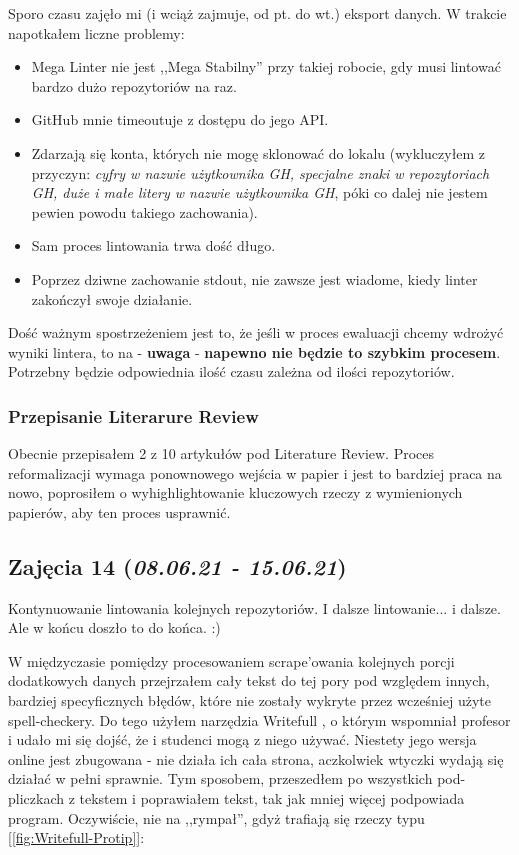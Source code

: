 \documentclass[graybox]{svmult}
\begin{document}
Sporo czasu zajęło mi (i wciąż zajmuje, od pt. do wt.) eksport danych. W trakcie napotkałem liczne problemy:
\begin{itemize}
  \item Mega Linter nie jest ,,Mega Stabilny'' przy takiej robocie, gdy musi lintować bardzo dużo repozytoriów na raz.
  \item GitHub mnie timeoutuje z dostępu do jego API.
  \item Zdarzają się konta, których nie mogę sklonować do lokalu (wykluczyłem z przyczyn: \textit{cyfry w nazwie użytkownika GH, specjalne znaki w repozytoriach GH, duże i małe litery w nazwie użytkownika GH}, póki co dalej nie jestem pewien powodu takiego zachowania).
  \item Sam proces lintowania trwa dość długo.
  \item Poprzez dziwne zachowanie stdout, nie zawsze jest wiadome, kiedy linter zakończył swoje działanie.
\end{itemize}

Dość ważnym spostrzeżeniem jest to, że jeśli w proces ewaluacji chcemy wdrożyć wyniki lintera, to na - \textbf{uwaga} - \textbf{napewno nie będzie to szybkim procesem}. Potrzebny będzie odpowiednia ilość czasu zależna od ilości repozytoriów.

\subsubsection{Przepisanie Literarure Review}

Obecnie przepisałem 2 z 10 artykułów pod Literature Review. Proces reformalizacji wymaga ponownowego wejścia w papier i jest to bardziej praca na nowo, poprosiłem o wyhighlightowanie kluczowych rzeczy z wymienionych papierów, aby ten proces usprawnić.

\subsection{Zajęcia 14 (\emph{08.06.21 - 15.06.21})}

Kontynuowanie lintowania kolejnych repozytoriów. I dalsze lintowanie... i dalsze. Ale w końcu doszło to do końca. :)

W międzyczasie pomiędzy procesowaniem scrape'owania kolejnych porcji dodatkowych danych przejrzałem cały tekst do tej pory pod względem innych, bardziej specyficznych błędów, które nie zostały wykryte przez wcześniej użyte spell-checkery. Do tego użyłem narzędzia Writefull , o którym wspomniał profesor i udało mi się dojść, że i studenci mogą z niego używać. Niestety jego wersja online jest zbugowana - nie działa ich cała strona, aczkolwiek wtyczki wydają się działać w pełni sprawnie. Tym sposobem, przeszedłem po wszystkich pod-pliczkach z tekstem i poprawiałem tekst, tak jak mniej więcej podpowiada program. Oczywiście, nie na ,,rympał'', gdyż trafiają się rzeczy typu [\ref{fig:Writefull-Protip}]:
\end{document}
